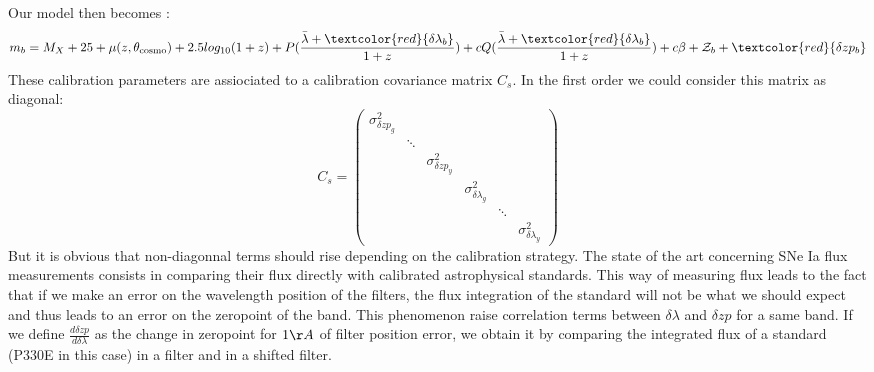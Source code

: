 \documentclass[\docopts]{\docclass}
\begin{document}
Our model then becomes :
\begin{equation}
m_b = M_X + 25 + \mu(z, \theta_\text{cosmo}) + 2.5log_{10}(1+z) + P(\frac{\bar \lambda + \textcolor{red}{\delta\lambda_b}}{1+z}) + cQ(\frac{\bar \lambda + \textcolor{red}{\delta\lambda_b}}{1+z}) + {c\beta} + \mathcal{Z}_b + \textcolor{red}{\delta zp_b}
\end{equation}
These calibration parameters are assiociated to a calibration covariance matrix $C_s$.
In the first order we could consider this matrix as diagonal:
\begin{equation}
C_s = 
\begin{pmatrix}
   \sigma^2_{\delta zp_{g}} & \ & \ & \ & \ & \ \\
   \ & \ddots & \ & \ & \ & \ \\
   \ & \ & \sigma^2_{\delta zp_{y}} & \ & \ & \ \\
   \ & \ & \ & \sigma^2_{\delta\lambda_{g}} & \ & \ \\
   \ & \ & \ & \ & \ddots & \ \\
   \ & \ & \ & \ & \ & \sigma^2_{\delta\lambda_{y}}
\end{pmatrix}
\end{equation}
But it is obvious that non-diagonnal terms should rise depending on the calibration strategy.
The state of the art concerning SNe Ia flux measurements consists in comparing their flux directly with calibrated astrophysical standards.
This way of measuring flux leads to the fact that if we make an error on the wavelength position of the filters, the flux integration of the standard will not be what we should expect and thus leads to an error on the zeropoint of the band.
This phenomenon raise correlation terms between $\delta \lambda$ and $\delta zp$ for a same band.
If we define $\frac{d \delta zp}{d \delta \lambda}$ as the change in zeropoint for $1 \AA$ of filter position error, we obtain it by comparing the integrated flux of a standard (P330E in this case) in a filter and in a shifted filter.
\end{document}
